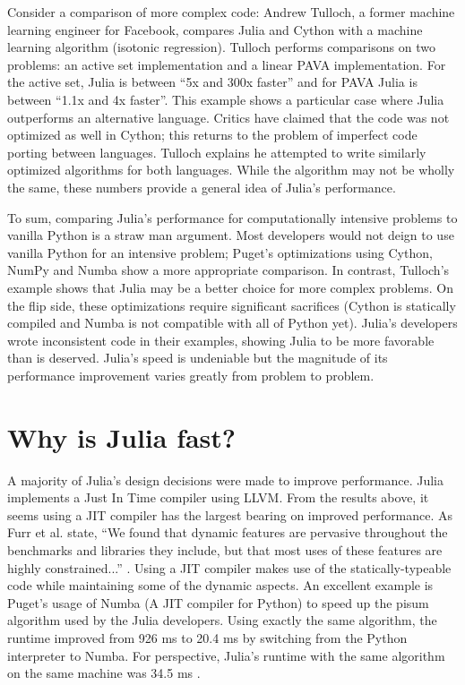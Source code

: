 \documentclass[12pt]{article}
\begin{document}
Consider a comparison of more complex code: Andrew Tulloch, a former machine learning engineer for Facebook, compares Julia and Cython with a machine learning algorithm (isotonic regression)\cite{tulloch}. Tulloch performs comparisons on two problems: an active set implementation and a linear PAVA implementation. For the active set, Julia is between ``5x and 300x faster'' and for PAVA Julia is between ``1.1x and 4x faster''\cite{tulloch}. This example shows a particular case where Julia outperforms an alternative language. Critics have claimed that the code was not optimized as well in Cython; this returns to the problem of imperfect code porting between languages. Tulloch explains he attempted to write similarly optimized algorithms for both languages. While the algorithm may not be wholly the same, these numbers provide a general idea of Julia's performance.

To sum, comparing Julia's performance for computationally intensive problems to vanilla Python is a straw man argument. Most developers would not deign to use vanilla Python for an intensive problem; Puget's optimizations using Cython, NumPy and Numba show a more appropriate comparison. In contrast, Tulloch's example shows that Julia may be a better choice for more complex problems. On the flip side, these optimizations require significant sacrifices (Cython is statically compiled and Numba is not compatible with all of Python yet). Julia's developers wrote inconsistent code in their examples, showing Julia to be more favorable than is deserved. Julia's speed is undeniable but the magnitude of its performance improvement varies greatly from problem to problem.

\section{Why is Julia fast?}

A majority of Julia's design decisions were made to improve performance. Julia implements a Just In Time compiler using LLVM. From the results above, it seems using a JIT compiler has the largest bearing on improved performance. As Furr et al. state, ``We found that dynamic features are pervasive throughout the benchmarks and libraries they include, but that most uses of these features are highly constrained...'' \cite{furranfoster}. Using a JIT compiler makes use of the statically-typeable code while maintaining some of the dynamic aspects. An excellent example is Puget's usage of Numba (A JIT compiler for Python) to speed up the pisum algorithm used by the Julia developers. Using exactly the same algorithm, the runtime improved from 926 ms to 20.4 ms by switching from the Python interpreter to Numba. For perspective, Julia's runtime with the same algorithm on the same machine was 34.5 ms \cite{pugetdevworks}.
\end{document}
